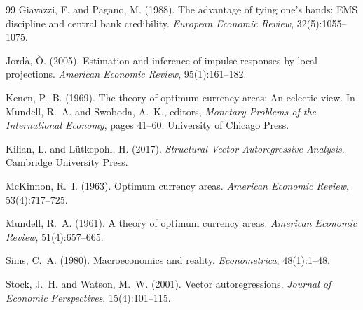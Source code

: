 \documentclass[11pt,a4paper]{article}
\begin{document}
\begin{thebibliography}{99}
Giavazzi, F. and Pagano, M. (1988).
\newblock The advantage of tying one's hands: EMS discipline and central bank
  credibility.
\newblock \emph{European Economic Review}, 32(5):1055--1075.

Jord\`{a}, \`{O}. (2005).
\newblock Estimation and inference of impulse responses by local projections.
\newblock \emph{American Economic Review}, 95(1):161--182.

Kenen, P.~B. (1969).
\newblock The theory of optimum currency areas: An eclectic view.
\newblock In Mundell, R.~A. and Swoboda, A.~K., editors, \emph{Monetary
  Problems of the International Economy}, pages 41--60. University of Chicago
  Press.

Kilian, L. and L\"{u}tkepohl, H. (2017).
\newblock \emph{Structural Vector Autoregressive Analysis}.
\newblock Cambridge University Press.

McKinnon, R.~I. (1963).
\newblock Optimum currency areas.
\newblock \emph{American Economic Review}, 53(4):717--725.

Mundell, R.~A. (1961).
\newblock A theory of optimum currency areas.
\newblock \emph{American Economic Review}, 51(4):657--665.

Sims, C.~A. (1980).
\newblock Macroeconomics and reality.
\newblock \emph{Econometrica}, 48(1):1--48.

Stock, J.~H. and Watson, M.~W. (2001).
\newblock Vector autoregressions.
\newblock \emph{Journal of Economic Perspectives}, 15(4):101--115.

\end{thebibliography}
\endgroup
\end{document}
